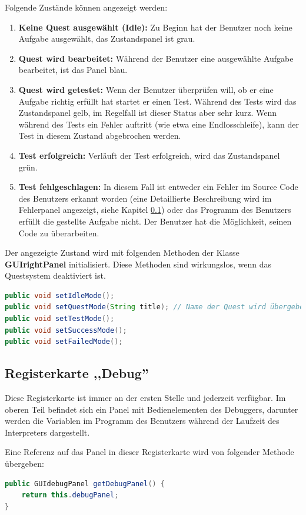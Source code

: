 Folgende Zustände können angezeigt werden:
\begin{enumerate}
\item \textbf{Keine Quest ausgewählt (Idle):} Zu Beginn hat der Benutzer noch keine Aufgabe ausgewählt, das Zustandspanel ist grau.
\item \textbf{Quest wird bearbeitet:} Während der Benutzer eine ausgewählte Aufgabe bearbeitet, ist das Panel blau.
\item \textbf{Quest wird getestet:} Wenn der Benutzer überprüfen will, ob er eine Aufgabe richtig erfüllt hat startet er einen Test. Während des Tests wird das Zustandspanel gelb, im Regelfall ist dieser Status aber sehr kurz. Wenn während des Tests ein Fehler auftritt (wie etwa eine Endlosschleife), kann der Test in diesem Zustand abgebrochen werden.
\item \textbf{Test erfolgreich:} Verläuft der Test erfolgreich, wird das Zustandspanel grün.
\item \textbf{Test fehlgeschlagen:} In diesem Fall ist entweder ein Fehler im Source Code des Benutzers erkannt worden (eine Detaillierte Beschreibung wird im Fehlerpanel angezeigt, siehe Kapitel \ref{}) oder das Programm des Benutzers erfüllt die gestellte Aufgabe nicht. Der Benutzer hat die Möglichkeit, seinen Code zu überarbeiten.
\end{enumerate}

Der angezeigte Zustand wird mit folgenden Methoden der Klasse \textbf{GUIrightPanel} initialisiert. Diese Methoden sind wirkungslos, wenn das Questsystem deaktiviert ist.
\begin{lstlisting}[language=JAVA]
public void setIdleMode();
public void setQuestMode(String title); // Name der Quest wird übergeben
public void setTestMode();
public void setSuccessMode();
public void setFailedMode();
\end{lstlisting}

\subsection{Registerkarte ,,Debug''}
Diese Registerkarte ist immer an der ersten Stelle und jederzeit verfügbar. Im oberen Teil befindet sich ein Panel mit Bedienelementen des Debuggers, darunter werden die Variablen im Programm des Benutzers während der Laufzeit des Interpreters dargestellt.

Eine Referenz auf das Panel in dieser Registerkarte wird von folgender Methode übergeben:
\begin{lstlisting}[language=JAVA]
public GUIdebugPanel getDebugPanel() {
	return this.debugPanel;
}
\end{lstlisting}

